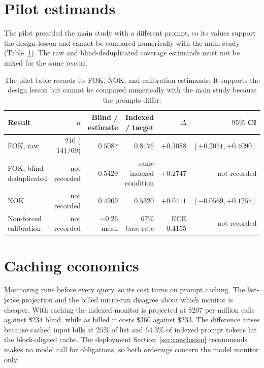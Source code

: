 \documentclass{article}
\begin{document}
\section{Pilot estimands}\label{sup:pilot}

The pilot preceded the main study with a different prompt, so its values support the design lesson and cannot be compared numerically with the main study (Table~\ref{tab:pilot-record}).
The raw and blind-deduplicated coverage estimands must not be mixed for the same reason.

\begin{table}[H]
\caption{The pilot table records its FOK, NOK, and calibration estimands. It supports the design lesson but cannot be compared numerically with the main study because the prompts differ.}
\label{tab:pilot-record}
\centering
\scriptsize
\begin{tabular}{@{}lrrrrr@{}}
\toprule
Result & $n$ & Blind / estimate & Indexed / target & $\Delta$ & $95\%$ CI \\
\midrule
FOK, raw & $210$ ($141/69$) & $0.5087$ & $0.8176$ & $+0.3088$ & $[+0.2051,+0.4090]$ \\
FOK, blind-deduplicated & not recorded & $0.5429$ & same indexed condition & $+0.2747$ & not recorded \\
NOK & not recorded & $0.4909$ & $0.5320$ & $+0.0411$ & $[-0.0569,+0.1255]$ \\
Non-forced calibration & not recorded & $\mathord{\sim}0.26$ mean & $67\%$ base rate & ECE $0.4155$ & not recorded \\
\bottomrule
\end{tabular}
\end{table}

\section{Caching economics}\label{sup:economics}

Monitoring runs before every query, so its cost turns on prompt caching.
The list-price projection and the billed micro-run disagree about which monitor is cheaper.
With caching the indexed monitor is projected at \$207 per million calls against \$234 blind, while as billed it costs \$360 against \$233.
The difference arises because cached input bills at $25\%$ of list and $64.3\%$ of indexed prompt tokens hit the block-aligned cache.
The deployment Section~\ref{sec:conclusion} recommends makes no model call for obligations, so both orderings concern the model monitor only.
\end{document}
